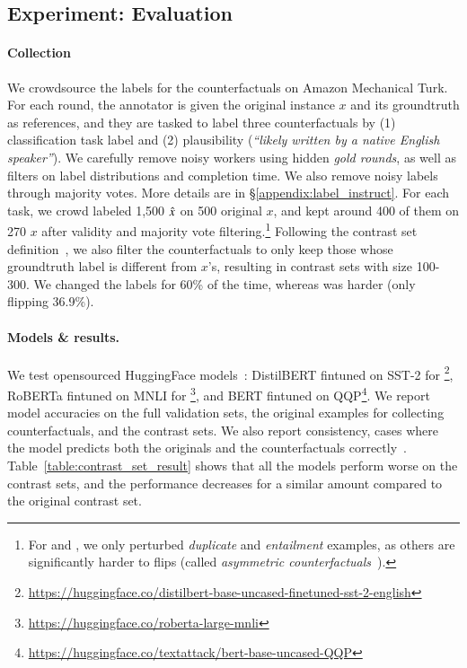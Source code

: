 \subsection{Experiment: Evaluation}
\label{subsec:contrast_set}



\TableAugSST
\TableAugNLI

\paragraph{Collection} 
We crowdsource the labels for the counterfactuals on Amazon Mechanical Turk. 
For each round, the annotator is given the original instance $x$ and its groundtruth as references, and they are tasked to label three counterfactuals by (1) classification task label and (2) plausibility (\emph{``likely written by a native English speaker''}). 
We carefully remove noisy workers using hidden \emph{gold rounds}, as well as filters on label distributions and completion time.
We also remove noisy labels through majority votes.
More details are in \S\ref{appendix:label_instruct}. 
For each task, we crowd labeled 1,500 $\hat{x}$ on 500 original $x$, and kept around 400 of them on 270 $x$ after validity and majority vote filtering.\footnote{For \qqp and \nli, we only perturbed \emph{duplicate} and \emph{entailment} examples, as others are significantly harder to flips (called \emph{asymmetric counterfactuals}~\cite{garg2019counterfactual}).}
Following the contrast set definition~\cite{gardner2020contrast}, we also filter the counterfactuals to only keep those whose groundtruth label is different from $x$'s, resulting in contrast sets with size 100-300.
We changed the \nli labels for 60\% of the time, whereas \sst was harder (only flipping 36.9\%).

\paragraph{Models \& results.}
We test opensourced HuggingFace models~\cite{Wolf2019HuggingFacesTS}:
DistilBERT fintuned on SST-2 for \sst\footnote{\url{https://huggingface.co/distilbert-base-uncased-finetuned-sst-2-english}},
RoBERTa fintuned on MNLI for \nli\footnote{\url{https://huggingface.co/roberta-large-mnli}},
and BERT fintuned on QQP\footnote{\url{https://huggingface.co/textattack/bert-base-uncased-QQP}}.
We report model accuracies on the full validation sets, the original examples for collecting counterfactuals, and the contrast sets.
We also report consistency, \ie cases where the model predicts both the originals and the counterfactuals correctly~\cite{li2020linguistically}.
Table~\ref{table:contrast_set_result} shows that all the models perform worse on the contrast sets, and the performance decreases for a similar amount compared to the original contrast set.


